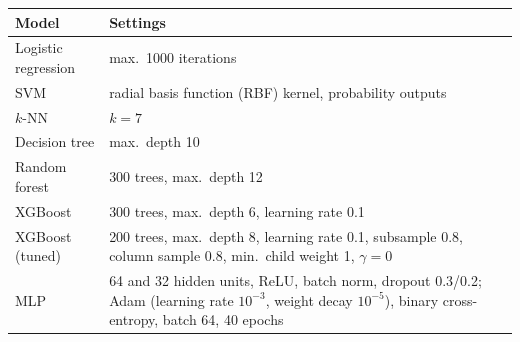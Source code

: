 \begin{tabular}{@{}lp{5.6cm}@{}}
\toprule
Model & Settings \\
\midrule
Logistic regression & max.\ 1000 iterations \\
SVM & radial basis function (RBF) kernel, probability outputs \\
$k$-NN & $k = 7$ \\
Decision tree & max.\ depth 10 \\
Random forest & 300 trees, max.\ depth 12 \\
XGBoost & 300 trees, max.\ depth 6, learning rate 0.1 \\
XGBoost (tuned) & 200 trees, max.\ depth 8, learning rate 0.1, subsample 0.8, column sample 0.8, min.\ child weight 1, $\gamma = 0$ \\
MLP & 64 and 32 hidden units, ReLU, batch norm, dropout 0.3/0.2; Adam (learning rate $10^{-3}$, weight decay $10^{-5}$), binary cross-entropy, batch 64, 40 epochs \\
\bottomrule
\end{tabular}

